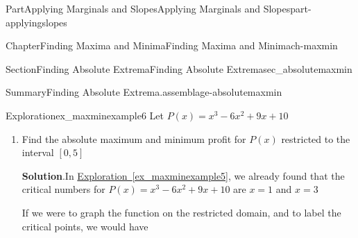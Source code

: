 \documentclass{tufte-book}
\newcommand{\blocktitlefont}{\relax}
\newcommand{\xreffont}{\relax}
\numberwithin{equation}{chapter}
\begin{document}
\begin{partptx}{Part}{Applying Marginals and Slopes}{}{Applying Marginals and Slopes}{}{}{part-applyingslopes}
\begin{chapterptx}{Chapter}{Finding Maxima and Minima}{}{Finding Maxima and Minima}{}{}{ch-maxmin}
\begin{sectionptx}{Section}{Finding Absolute Extrema}{}{Finding Absolute Extrema}{}{}{sec_absolutemaxmin}
\begin{assemblage}{Summary}{Finding Absolute Extrema.}{assemblage-absolutemaxmin}
\end{assemblage}
\begin{exploration}{Exploration}{}{ex_maxminexample6}%
Let \(P(x)  = x^3 - 6x^2  + 9x + 10\)%
\begin{enumerate}[font=\bfseries,label=(\alph*),ref=\alph*]%
\item{}Find the absolute maximum and minimum profit for  \(P(x)\) restricted to the interval \([0,5]\)%
\par\smallskip%
\noindent\textbf{\blocktitlefont Solution}.\hypertarget{ex_maxminexample6-2-2}{}\quad{}In \hyperref[ex_maxminexample5]{Exploration~{\xreffont\ref{ex_maxminexample5}}}, we already found that the critical numbers for \(P(x)  = x^3 - 6x^2  + 9x + 10\) are \(x=1\) and \(x=3\)%
\par
If we were to graph the function on the restricted domain, and to label the critical points, we would have \begin{image}{0.25}{0.5}{0.25}{}%
\end{image}
\end{enumerate}
\end{exploration}
\end{sectionptx}
\end{chapterptx}
\end{partptx}
\end{document}
